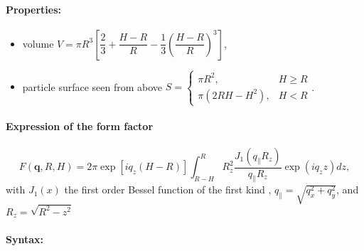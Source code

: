 \paragraph{Properties:}
\begin{itemize}
\item volume $V=\pi R^3 \left[\dfrac{2}{3} + \dfrac{H-R}{R} - \dfrac{1}{3}\left(\dfrac{H-R}{R}\right)^3\right]$,
\item particle surface seen from above $S = \left\{\begin{array}{ll} \pi R^2, & H \geq R \\
         \pi\left(2RH-H^2\right), & H < R \end{array}\right. $.
\end{itemize}

\paragraph{Expression of the form factor}
\begin{equation*}  
F(\mathbf{q},R, H)= 2\pi \exp[i q_z (H-R)]\int_{R-H} ^{R} R_z^2 \frac{J_1(q_{\parallel} R_z) }{q_{\parallel} R_z} \exp(i q_z z) dz,
\end{equation*}
with $J_1(x)$ the first order
Bessel function of the first kind \cite{AbSt64}, $q_{\parallel} =
\sqrt{q_x^2+q_y^2}$, and $R_z = \sqrt{R^2-z^2}$

\paragraph{Syntax:} 

